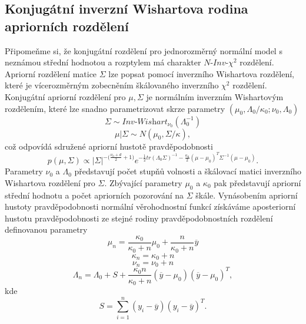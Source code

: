\subsection{Konjugátní inverzní Wishartova rodina apriorních rozdělení}

Připomeňme si, že konjugátní rozdělení pro jednorozměrný normální model s neznámou střední hodnotou a rozptylem má charakter $\textit{N-Inv-}\chi^2$ rozdělení. Apriorní rozdělení matice $\Sigma$ lze popsat pomocí inverzního Wishartova rozdělení, které je vícerozměrným zobecněním škálovaného inverzního $\chi^2$ rozdělení. Konjugátní apriorní rozdělení pro $\mu, \Sigma$ je normálním inverzním Wishartovým rozdělením, které lze snadno parametrizovat skrze parametry $(\mu_0, \Lambda_0/ \kappa_0; \nu_0, \Lambda_0)$
\begin{equation}
\Sigma \sim \textit{Inv-Wishart}_{\nu_0}(\Lambda_0^{-1})
\end{equation}
\begin{equation}
\mu | \Sigma \sim N(\mu_0, \Sigma / \kappa),
\end{equation}
což odpovídá sdružené apriorní hustotě pravděpodobnosti
\begin{equation}
p(\mu, \Sigma) \varpropto |\Sigma|^{-\Big(\frac{\nu_0 + d}{2} + 1\Big)}e^{-\frac{1}{2}tr(\Lambda_0 \Sigma)^{-1} - \frac{\kappa_0}{2}(\mu - \mu_0)^T \Sigma^{-1} (\mu - \mu_0)}.
\end{equation}
Parametry $\nu_0$ a $\Lambda_0$ představují počet stupňů volnosti a škálovací matici inverzního Wishartova rozdělení pro $\Sigma$. Zbývající parametry $\mu_0$ a $\kappa_0$ pak představují apriorní střední hodnotu a počet apriorních pozorování na $\Sigma$ škále. Vynásobením apriorní hustoty pravděpodobnosti normální věrohodnostní funkcí získáváme aposteriorní hustotu pravděpodobnosti ze stejné rodiny pravděpodobnostních rozdělení definovanou parametry
\begin{equation}
\mu_n = \frac{\kappa_0}{\kappa_0 + n} \mu_0 + \frac{n}{\kappa_0 + n}\overline{y}
\end{equation}
\begin{equation}
\kappa_n = \kappa_0 + n
\end{equation}
\begin{equation}
\nu_n = \nu_0 + n
\end{equation}
\begin{equation}
\Lambda_n = \Lambda_0 + S + \frac{\kappa_0 n}{\kappa_0 + n}(\overline{y} - \mu_0)(\overline{y} - \mu_0)^T,
\end{equation}
kde
\begin{equation}
S = \sum_{i = 1}^n (y_i - \overline{y})(y_i - \overline{y})^T.
\end{equation}

